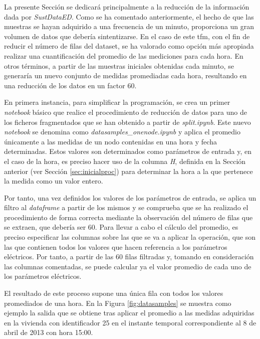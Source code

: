 La presente Sección se dedicará principalmente a la reducción de la información dada por \textit{SustDataED}. Como se ha comentado anteriormente, el hecho de que las muestras se hayan adquirido a una frecuencia de un minuto, proporciona un gran volumen de datos que debería sintentizarse. En el caso de este \gls{tfm}, con el fin de reducir el número de filas del dataset, se ha valorado como opción más apropiada realizar una cuantificación del promedio de las mediciones para cada hora. En otros términos, a partir de las muestras iniciales obtenidas cada minuto, se generaría un nuevo conjunto de medidas promediadas cada hora, resultando en una reducción de los datos en un factor 60.

\vspace{3mm}

En primera instancia, para simplificar la programación, se crea un primer \textit{notebook} básico que realice el procedimiento de reducción de datos para uno de los ficheros fragmentados que se han obtenido a partir de \textit{split.ipynb}. Este nuevo \textit{notebook} se denomina como \textit{datasamples\_onenode.ipynb} y aplica el promedio únicamente a las medidas de un nodo contenidas en una hora y fecha determinadas. Estos valores son determinados como parámetros de entrada y, en el caso de la hora, es preciso hacer uso de la columna \textit{H}, definida en la Sección anterior (ver Sección \ref{sec:inicialproc}) para determinar la hora a la que pertenece la medida como un valor entero.

\vspace{3mm}

Por tanto, una vez definidos los valores de los parámetros de entrada, se aplica un filtro al \textit{dataframe} a partir de los mismos y se comprueba que se ha realizado el procedimiento de forma correcta mediante la observación del número de filas que se extraen, que debería ser 60. Para llevar a cabo el cálculo del promedio, es preciso especificar las columnas sobre las que se va a aplicar la operación, que son las que contienen todos los valores que hacen referencia a los parámetros eléctricos. Por tanto, a partir de las 60 filas filtradas y, tomando en consideración las columnas comentadas, se puede calcular ya el valor promedio de cada uno de los parámetros eléctricos. 

\vspace{3mm}

El resultado de este proceso supone una única fila con todos los valores promediados de una hora. En la Figura \ref{fig:datasamples} se muestra como ejemplo la salida que se obtiene tras aplicar el promedio a las medidas adquiridas en la vivienda con identificador 25 en el instante temporal correspondiente al 8 de abril de 2013 con hora 15:00.

